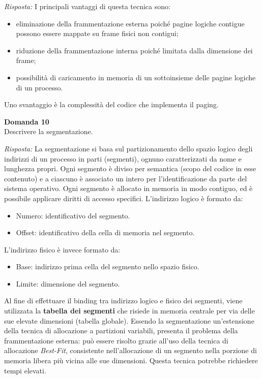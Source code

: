 \documentclass{article}
\newenvironment{problem}[2][Domanda]
    { \begin{mdframed}[backgroundcolor=gray!20] \textbf{#1 #2} \\}
    {  \end{mdframed}}
\newenvironment{solution}
    {\textit{Risposta:}}
    {}
\begin{document}
\begin{solution}
I principali vantaggi di questa tecnica sono:
\begin{itemize}
    \item eliminazione della frammentazione esterna poiché pagine logiche contigue possono essere mappate su frame fisici non contigui;
    \item riduzione della frammentazione interna poiché limitata dalla dimensione dei frame;
    \item possibilità di caricamento in memoria di un sottoinsieme delle pagine logiche di un processo.
\end{itemize}
Uno svantaggio è la complessità del codice che implementa il paging.
\end{solution}
\begin{problem}{10}
Descrivere la segmentazione.
\end{problem}
\begin{solution}
La segmentazione si basa sul partizionamento dello spazio logico degli indirizzi di un processo in parti (segmenti), ognuno caratterizzati da nome e lunghezza propri.
\newline
Ogni segmento è diviso per semantica (scopo del codice in esse contenuto) e a ciascuno è associato un intero per l’identificazione da parte del sistema operativo.
\newline
Ogni segmento è allocato in memoria in modo contiguo, ed è possibile applicare diritti di accesso specifici.
\newline
\newline
L’indirizzo logico è formato da:
\begin{itemize}
    \item Numero: identificativo del segmento.
    \item Offset: identificativo della cella di memoria nel segmento.
\end{itemize}
L’indirizzo fisico è invece formato da:
\begin{itemize}
    \item Base: indirizzo prima cella del segmento nello spazio fisico.
    \item Limite: dimensione del segmento.
\end{itemize}
Al fine di effettuare il binding tra indirizzo logico e fisico dei segmenti, viene utilizzata la \textbf{tabella dei segmenti} che risiede in memoria centrale per via delle sue elevate dimensioni (tabella globale).
\newline
Essendo la segmentazione un’estensione della tecnica di allocazione a partizioni variabili, presenta il problema della frammentazione esterna: può essere risolto grazie all’uso della tecnica di allocazione \emph{Best-Fit}, consistente nell’allocazione di un segmento nella porzione di memoria libera più vicina alle sue dimensioni. 
\newline
Questa tecnica potrebbe richiedere tempi elevati.
\end{solution}
\end{document}
